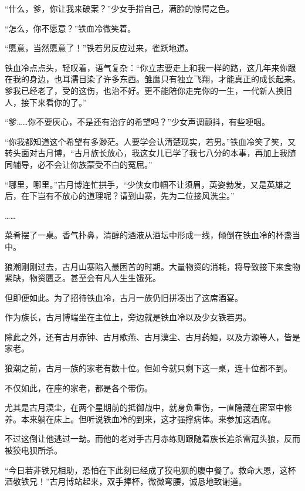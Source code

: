 
\begin{this_body}



“什么，爹，你让我来破案？”少女手指自己，满脸的惊愕之色。

“怎么，你不愿意？”铁血冷微笑着。

“愿意，当然愿意了！”铁若男反应过来，雀跃地道。

铁血冷点点头，轻叹着，语气复杂：“你立志要走上和我一样的路，这几年来你跟在我的身边，也耳濡目染了许多东西。雏鹰只有独立飞翔，才能真正的成长起来。爹我已经老了，受的这伤，也治不好。更不能陪你走完你的一生，一代新人换旧人，接下来看你的了。”

“爹……你不要灰心，不是还有治疗的希望吗？”少女声调颤抖，有些哽咽。

“你我都知道这个希望有多渺茫。人要学会认清楚现实，若男。”铁血冷笑了笑，又转头面对古月博，“古月族长放心，我这女儿已学了我七八分的本事，再加上我随同辅导，必不会让你族蒙受不白的冤屈。”

“哪里，哪里。”古月博连忙拱手，“少侠女巾帼不让须眉，英姿勃发，又是英雄之后，在下岂有不放心的道理呢？请到山寨，先为二位接风洗尘。”

……

菜肴摆了一桌。香气扑鼻，清醇的酒液从酒坛中形成一线，倾倒在铁血冷的杯盏当中。

狼潮刚刚过去，古月山寨陷入最困苦的时期。大量物资的消耗，将导致接下来食物紧缺，物资匮乏。甚至会有凡人生生饿死。

但即便如此。为了招待铁血冷，古月一族仍旧拼凑出了这席酒宴。

作为族长，古月博端坐在主位上，旁边就是铁血冷以及少女铁若男。

除此之外，还有古月赤钟、古月歌燕、古月漠尘、古月药姬，以及方源等人，皆是家老。

狼潮之前，古月一族的家老有数十位。但如今就只剩下这一桌，连十位都不到。

不仅如此，在座的家老，都是各个带伤。

尤其是古月漠尘，在两个星期前的抵御战中，就身负重伤，一直隐藏在密室中修养。本来躺在床上。但听说铁血冷的到来，这才强撑病体。来参加这酒席。

不过这倒让他逃过一劫。而他的老对手古月赤练则跟随着族长追杀雷冠头狼，反而被狡电狈所杀。

“今日若非铁兄相助，恐怕在下此刻已经成了狡电狈的腹中餐了。救命大恩，这杯酒敬铁兄！”古月博站起来，双手捧杯，微微弯腰，诚恳地致谢道。


\end{this_body}
